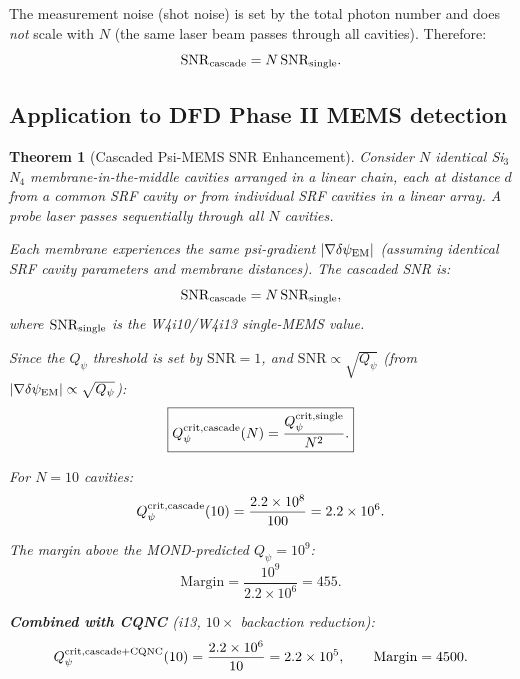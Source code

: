 \documentclass[11pt]{article}
\newcommand{\ee}[1]{\times 10^{#1}}
\newcommand{\Qpsi}{Q_\psi}
\newcommand{\SNR}{\mathrm{SNR}}
\newcommand{\dpsiEM}{\delta\psi_{\rm EM}}
\newtheorem{theorem}{Theorem}[section]
\theoremstyle{definition}
\theoremstyle{remark}
\begin{document}
The measurement noise (shot noise) is set by the total photon number
and does \emph{not} scale with $N$ (the same laser beam passes through
all cavities). Therefore:
\begin{equation}
\SNR_{\rm cascade} = N\,\SNR_{\rm single}.
\label{eq:SNR_cascade}
\end{equation}

\subsection{Application to DFD Phase II MEMS detection}

\begin{theorem}[Cascaded Psi-MEMS SNR Enhancement]
\label{thm:cascaded}
Consider $N$ identical Si$_3$N$_4$ membrane-in-the-middle cavities
arranged in a linear chain, each at distance $d$ from a common SRF
cavity or from individual SRF cavities in a linear array. A probe
laser passes sequentially through all $N$ cavities.

Each membrane experiences the same psi-gradient $|\nabla\dpsiEM|$
(assuming identical SRF cavity parameters and membrane distances).
The cascaded SNR is:
\begin{equation}
\SNR_{\rm cascade} = N\,\SNR_{\rm single},
\end{equation}
where $\SNR_{\rm single}$ is the W4i10/W4i13 single-MEMS value.

Since the $\Qpsi$ threshold is set by $\SNR = 1$, and
$\SNR \propto \sqrt{\Qpsi}$ (from $|\nabla\dpsiEM| \propto
\sqrt{\Qpsi}$):
\begin{equation}
\boxed{
\Qpsi^{\rm crit, cascade}(N) = \frac{\Qpsi^{\rm crit, single}}{N^2}.
}
\label{eq:Qpsi_cascade}
\end{equation}

For $N = 10$ cavities:
\begin{equation}
\Qpsi^{\rm crit, cascade}(10) = \frac{2.2\ee{8}}{100}
= 2.2\ee{6}.
\label{eq:Qpsi_cascade_10}
\end{equation}

The margin above the MOND-predicted $\Qpsi = 10^9$:
\begin{equation}
\text{Margin} = \frac{10^9}{2.2\ee{6}} = 455.
\end{equation}

\textbf{Combined with CQNC} (i13, $10\times$ backaction reduction):
\begin{equation}
\Qpsi^{\rm crit, cascade+CQNC}(10) = \frac{2.2\ee{6}}{10}
= 2.2\ee{5}, \qquad \text{Margin} = 4500.
\label{eq:Qpsi_combined}
\end{equation}
\end{theorem}
\end{document}
